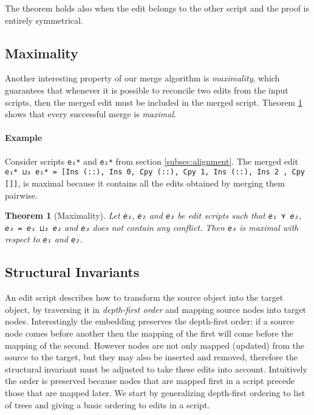 \documentclass[preprint]{sigplanconf}
\theoremstyle{plain}
\newtheorem{thm}{Theorem}
\begin{document}
    The theorem holds also when the edit belongs to the other script and
    the proof is entirely symmetrical.
   		
    \subsection{Maximality}
    Another interesting property of our merge algorithm is
    \emph{maximality}, which guarantees that whenever it is possible
    to reconcile two edits from the input scripts, then the merged
    edit must be included in the merged script.
    Theorem \ref{thm:max} shows that every successful merge is
    \emph{maximal}.

    \paragraph{Example} 
    Consider scripts \texttt{e₁*} and \texttt{e₂*} from section
    \ref{subsec:alignment}.
    The merged edit \texttt{e₁* ⊔₃ e₂* = [Ins (::), Ins 0, Cpy (::),
      Cpy 1, Ins (::), Ins 2 , Cpy []]}, is maximal because it
    contains all the edits obtained by merging them pairwise.
    \begin{thm}[Maximality]
      \label{thm:max}
      Let \texttt{e₁}, \texttt{e₂} and \texttt{e₃} be edit scripts
      such that \texttt{e₁ ⋎ e₂}, \texttt{e₃ = e₁ ⊔₃ e₂} and
      \texttt{e₃} does not contain any conflict. Then \texttt{e₃} is
      maximal with respect to \texttt{e₁} and \texttt{e₂}.
    \end{thm}

    \subsection{Structural  Invariants}
    An edit script describes how to transform the source object into
    the target object, by traversing it in \emph{depth-first order}
    and mapping source nodes into target nodes.
    Interestingly the embedding preserves the depth-first order: if a
    source node comes before another then the mapping of the first
    will come before the mapping of the second.    
    However nodes are not only mapped (updated) from the source to the
    target, but they may also be inserted and removed, therefore the
    structural invariant must be adjusted to take these edits into
    account.
    Intuitively the order is preserved because nodes that 
    are mapped first in a script precede those that are mapped later.
    We start by generalizing depth-first ordering to list of trees and
    giving a basic ordering to edits in a script.
    
\end{document}

